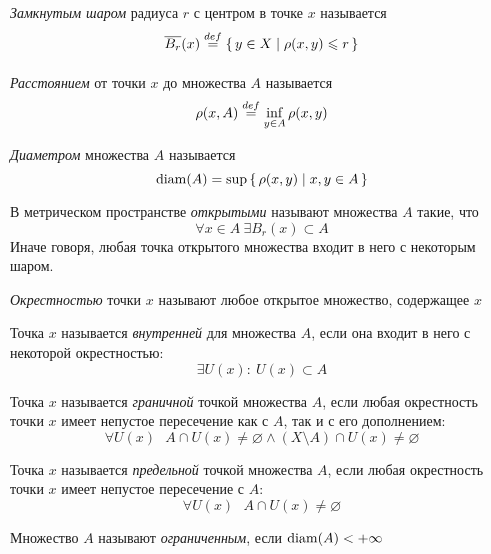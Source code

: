 \begin{definition}
    \textit{Замкнутым шаром} радиуса $r$ с центром в точке $x$ называется
\[
    \overline{B_r}(x) \overset{def}{\underset{}{=}} \{\, y \in X \mid \rho(x, y) \leqslant r \,\}
\]
\end{definition}

\begin{definition}
    \textit{Расстоянием} от точки $x$ до множества $A$ называется
\[
    \rho(x, A) \overset{def}{\underset{}{=}} \inf_{y \in A}{\rho(x, y)}
\]
\end{definition}

\begin{definition}
    \textit{Диаметром} множества $A$ называется
\[
    \operatorname{diam}(A) = \sup{\{\, \rho(x, y) \mid x, y \in A \,\}}
\]
\end{definition}

\begin{definition}
    В метрическом пространстве \textit{открытыми} называют множества $A$
    такие, что
\[
    \forall x \in A~ \exists B_r(x) \subset A
\]
Иначе говоря, любая точка открытого множества входит в него с некоторым шаром.
\end{definition}

\begin{definition}
    \textit{Окрестностью} точки $x$ называют любое открытое множество, содержащее
    $x$
\end{definition}

\begin{definition}
    Точка $x$ называется \textit{внутренней} для множества $A$, если она входит в
    него с некоторой окрестностью:
\[
    \exists U(x) \colon~ U(x) \subset A
\]
\end{definition}

\begin{definition}
    Точка $x$ называется \textit{граничной} точкой множества $A$, если любая окрестность
    точки $x$ имеет непустое пересечение как с $A$, так и с его дополнением:
\[
    \forall U(x)~~~ A \cap U(x) \neq \varnothing \wedge (X \setminus A) \cap U(x)
    \neq \varnothing
\]
\end{definition}

\begin{definition}
    Точка $x$ называется \textit{предельной} точкой множества $A$, если любая
    окрестность точки $x$ имеет непустое пересечение с $A$:
\[
    \forall U(x)~~~ A \cap U(x) \neq \varnothing
\]
\end{definition}

\begin{definition}
    Множество $A$ называют \textit{ограниченным}, если $\operatorname{diam}(A) < +\infty$
\end{definition}

